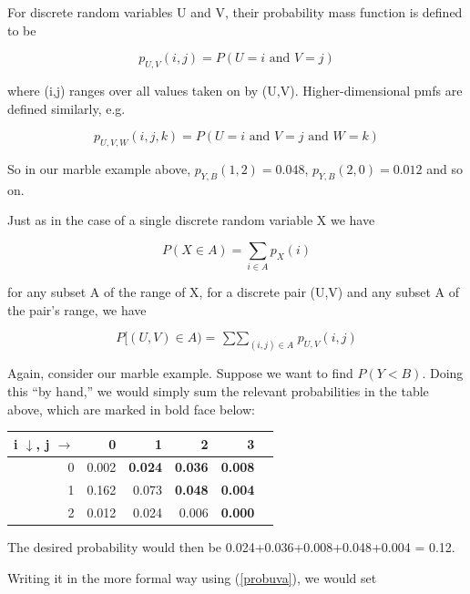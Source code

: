 \begin{definition}
For discrete random variables U and V, their 
probability mass function is defined to be

\begin{equation}
p_{U,V}(i,j) = P(U = i \textrm{ and } V = j)
\end{equation}

where (i,j) ranges over all values taken on by (U,V).
Higher-dimensional pmfs are defined similarly, e.g.

\begin{equation}
p_{U,V,W}(i,j,k) = P(U = i \textrm{ and } V = j \textrm{ and } W = k)
\end{equation}
\end{definition}

So in our marble example above, $p_{Y,B}(1,2) = 0.048$, $p_{Y,B}(2,0) =
0.012$ and so on.

Just as in the case of a single discrete random variable X we have

\begin{equation}
P(X \in A) = \sum_{i \in A} p_X(i)
\end{equation}

for any subset A of the range of X, for a discrete pair (U,V) and any
subset A of the pair's range, we have

\begin{equation}
\label{probuva}
P[(U,V) \in A) =
\mathop{\sum \sum}_{(i,j) \in A} p_{U,V}(i,j)
\end{equation}

Again, consider our marble example.  Suppose we want to find $P(Y < B)$.
Doing this ``by hand,'' we would simply sum the relevant probabilities 
in the table above, which are marked in bold face below:

\begin{tabular}{|r|r|r|r|r|r|}
\hline
i $\downarrow$, j $\rightarrow$ & 0 & 1 & 2 & 3 \\ \hline 
0 & 0.002 & {\bf 0.024} & {\bf 0.036} & {\bf 0.008} \\ \hline 
1 & 0.162 & 0.073 & {\bf 0.048} & {\bf 0.004} \\ \hline 
2 & 0.012 & 0.024 & 0.006 & {\bf 0.000} \\ \hline 
\end{tabular}

The desired probability would then be 0.024+0.036+0.008+0.048+0.004 =
0.12.

Writing it in the more formal way using (\ref{probuva}), we would set

